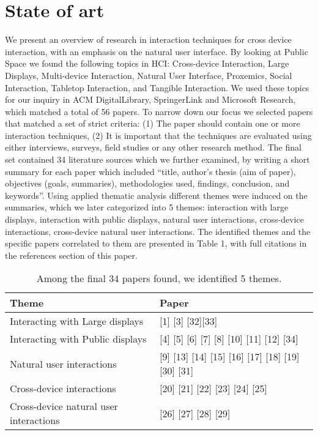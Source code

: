 \section{State of art}
We present an overview of research in interaction techniques for cross device interaction, with an emphasis on the natural user interface.
By looking at Public Space we found the following topics in HCI: Cross-device Interaction, Large Displays, Multi-device Interaction, Natural User Interface, Proxemics, Social Interaction, Tabletop Interaction, and Tangible Interaction. 
We used these topics for our inquiry in ACM DigitalLibrary, SpringerLink and Microsoft Research, which matched a total of 56 papers. 
To narrow down our focus we selected papers that matched a set of strict criteria: (1) The paper should contain one or more interaction techniques, (2) It is important that the techniques are evaluated using either interviews, surveys, field studies or any other research method.
The final set contained 34 literature sources which we further examined, by writing a short summary for each paper which included ``title, author's thesis (aim of paper), objectives (goals, summaries), methodologies used, findings, conclusion, and keywords''. 
Using applied thematic analysis different themes were induced on the summaries, which we later categorized into 5 themes: interaction with large displays, interaction with public displays, natural user interactions, cross-device interactions, cross-device natural user interactions.
The identified themes and the specific papers correlated to them are presented in Table 1, with full citations in the references section of this paper. 

\begin{table*}[t]
\centering
\begin{tabular}{@{}ll@{}}
\toprule
Theme & Paper \\ \midrule
Interacting with Large displays      &      [1] [3] [32][33] \\
Interacting with Public displays      &       [4] [5] [6] [7] [8] [10] [11] [12] [34] \\
Natural user interactions      &      [9] [13] [14] [15] [16] [17] [18] [19] [30] [31] \\
Cross-device interactions      &      [20] [21] [22] [23] [24] [25] \\
Cross-device natural user interactions      &      [26] [27] [28] [29] \\ \bottomrule
\end{tabular}
\caption{Among the final 34 papers found, we identified 5 themes.}
\label{table:themes}
\end{table*}